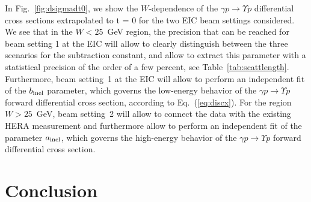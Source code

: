 \documentclass[prd,amsmath,%
twocolumn,floatfix,amssymb, preprintnumbers, linenumbers,nofootinbib, superscriptaddress]{revtex4}
\begin{document}
In Fig.~\ref{fig:dsigmadt0}, we show the $W$-dependence of the $\gamma p \to \Upsilon p$ differential cross sections extrapolated to t = 0 for the two EIC beam settings considered.  
We see that in the $W < 25$~GeV region, the precision that can be reached for beam setting 1 at the EIC will allow to clearly distinguish between the three scenarios for the subtraction constant, and allow to extract this parameter with a statistical precision of the order of a few percent, see Table~\ref{tab:scattlength}. Furthermore, beam setting~1 at the EIC will allow to perform an independent fit of the 
$b_{\rm inel}$ parameter, which governs the low-energy behavior of the $\gamma p \to \Upsilon p$ forward differential cross section, according to Eq.~(\ref{eq:discx}). 
For the region $W > 25$~GeV, beam setting~2 will allow to connect the data with the existing HERA measurement and furthermore allow to perform an independent fit of the parameter $a_{\rm inel}$, which governs the high-energy behavior of the $\gamma p \to \Upsilon p$ forward differential cross section.


\section{Conclusion}
\end{document}
